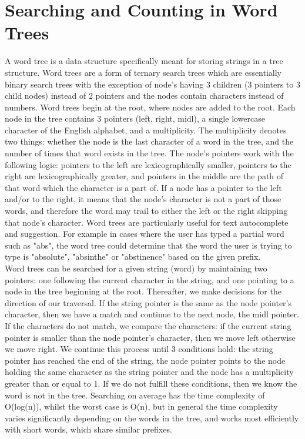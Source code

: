 \documentclass{article}
\begin{document}
  \section{Searching and Counting in Word Trees}
  \setlength{\parindent}{6ex}
  A word tree is a data structure specifically meant for storing strings in a tree structure. Word trees are a form of ternary search trees which are essentially binary search trees with the exception of node's having 3 children (3 pointers to 3 child nodes) instead of 2 pointers and the nodes contain characters instead of numbers. Word trees begin at the root, where nodes are added to the root. Each node in the tree contains 3 pointers (left, right, midl), a single lowercase character of the English alphabet, and a multiplicity. The multiplicity denotes two things: whether the node is the last character of a word in the tree, and the number of times that word exists in the tree. The node's pointers work with the following logic: pointers to the left are lexicographically smaller, pointers to the right are lexicographically greater, and pointers in the middle are the path of that word which the character is a part of. If a node has a pointer to the left and/or to the right, it means that the node's character is not a part of those words, and therefore the word may trail to either the left or the right skipping that node's character. Word trees are particularly useful for text autocomplete and suggestion. For example in cases where the user has typed a partial word such as "abs", the word tree could determine that the word the user is trying to type is "absolute", "absinthe" or "abstinence" based on the given prefix.
  \\[12pt]
  \indent Word trees can be searched for a given string (word) by maintaining two pointers: one following the current character in the string, and one pointing to a node in the tree beginning at the root. Thereafter, we make decisions for the direction of our traversal. If the string pointer is the same as the node pointer's character, then we have a match and continue to the next node, the midl pointer. If the characters do not match, we compare the characters: if the current string pointer is smaller than the node pointer's character, then we move left otherwise we move right. We continue this process until 3 conditions hold: the string pointer has reached the end of the string, the node pointer points to the node holding the same character as the string pointer and the node has a multiplicity greater than or equal to 1. If we do not fulfill these conditions, then we know the word is not in the tree. Searching on average has the time complexity of O(log(n)), whilst the worst case is O(n), but in general the time complexity varies significantly depending on the words in the tree, and works most efficiently with short words, which share similar prefixes.
\end{document}
